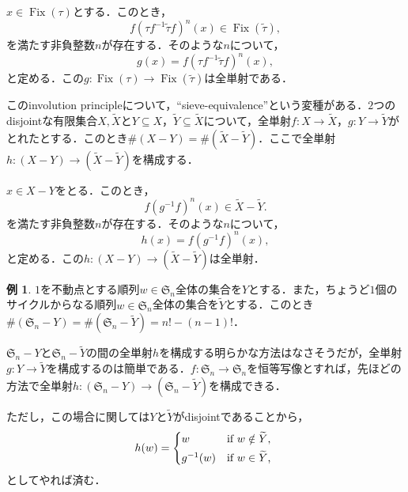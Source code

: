 \documentclass[xelatex,ja=standard,a4paper,14pt,everyparhook=compat]{bxjsarticle}
\DeclareMathOperator{\Fix}{Fix}
\newcommand{\wt}[1]{\widetilde{#1}}
\newcommand{\fS}{\mathfrak{S}}
\theoremstyle{definition}
\newtheorem{example}[theorem]{例}
\begin{document}
$x \in \Fix(\tau)$とする．このとき， \begin{equation*}
    f(\tau f^{-1} \wt \tau f)^n (x) \in \Fix(\wt \tau),
\end{equation*}
を満たす非負整数$n$が存在する．そのような$n$について， \begin{equation*}
    g(x) = f(\tau f^{-1} \wt \tau f)^n (x),
\end{equation*}
と定める．この$g : \Fix(\tau) \to \Fix(\wt \tau)$は全単射である．

このinvolution principleについて，``sieve-equivalence''という変種がある．$2$つのdisjointな有限集合$X, \wt X$と$Y \subseteq X$，$\wt Y \subseteq \wt X$について，全単射$f: X \to \wt X$，$g: Y \to \wt Y$がとれたとする．このとき$\#(X-Y) = \#(\wt X - \wt Y)$．ここで全単射$h: (X-Y) \to (\wt X - \wt Y)$を構成する．

$x \in X - Y$をとる．このとき， \begin{equation*}
    f (g^{-1} f)^n (x) \in \wt X - \wt Y.
\end{equation*}
を満たす非負整数$n$が存在する．そのような$n$について， \begin{equation*}
    h(x) = f(g^{-1} f)^n (x),
\end{equation*}
と定める．この$h : (X-Y) \to (\wt X-\wt Y)$は全単射．

\begin{example}
    $1$を不動点とする順列$w \in \fS_n$全体の集合を$Y$とする．また，ちょうど$1$個のサイクルからなる順列$w \in \fS_n$全体の集合を$\wt Y$とする．このとき$\#(\fS_n - Y) = \#(\fS_n - \wt Y) = n! - (n-1)!$．

    $\fS_n - Y$と$\fS_n - \wt Y$の間の全単射$h$を構成する明らかな方法はなさそうだが，全単射$g: Y \to \wt Y$を構成するのは簡単である．$f : \fS_n \to \fS_n$を恒等写像とすれば，先ほどの方法で全単射$h : (\fS_n - Y) \to (\fS_n - \wt Y)$を構成できる．

    ただし，この場合に関しては$Y$と$\wt Y$がdisjointであることから， \begin{equation*}
        h(w) = \begin{cases*}
            w         & if $w \notin \wt Y$, \\
            g^{-1}(w) & if $w \in \wt Y$,
        \end{cases*}
    \end{equation*}
    としてやれば済む．
\end{example}
\end{document}
